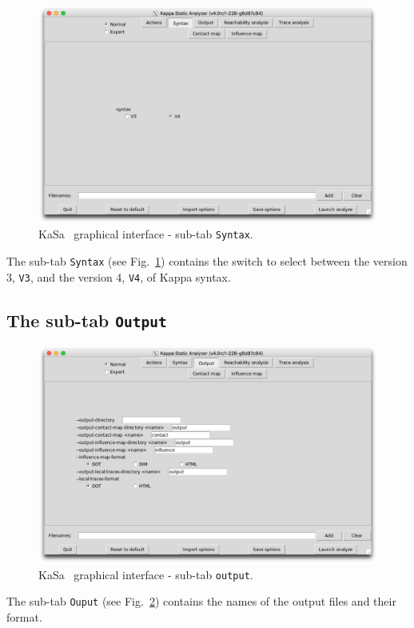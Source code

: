 \documentclass[11pt]{book}
\def\KaSa{\textsf{KaSa}}
\begin{document}
\begin{figure}[htbp]
  \centering
\includegraphics[width=12cm,bb=0 0 1904 1208]{img/kasa_1.png}
\caption{\KaSa~ graphical interface - sub-tab \texttt{Syntax}.}
\label{fig:kasa:01}
\end{figure}

The sub-tab \texttt{Syntax} (see Fig.~\ref{fig:kasa:01}) contains the switch to select between the version 3, \texttt{V3}, and the version 4, \texttt{V4}, of Kappa syntax.

\subsection{The sub-tab \texttt{Output}}

\begin{figure}[htbp]
\centering
\includegraphics[width=12cm]{img/kasa_2.png}
\caption{\KaSa~ graphical interface - sub-tab \texttt{output}.}
\label{fig:kasa:1}
\end{figure}


The sub-tab \texttt{Ouput} (see Fig.~\ref{fig:kasa:1}) contains the names of the output files and their format.
\end{document}

